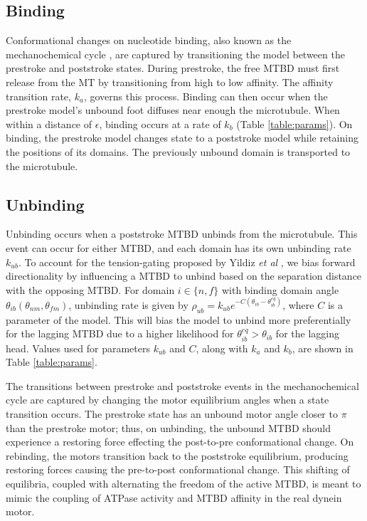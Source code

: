 \documentclass[9pt,twocolumn,twoside]{article}
\begin{document}
\subsection*{Binding}
Conformational changes on nucleotide binding, also known as the mechanochemical cycle \cite{cianfrocco}, are captured by transitioning the model between the prestroke and poststroke states. During prestroke, the free MTBD must first release from the MT by transitioning from high to low affinity. The affinity transition rate, $k_a$, governs this process. Binding can then occur when the prestroke model's unbound foot diffuses near enough the microtubule. When within a distance of $\epsilon$, binding occurs at a rate of $k_b$ (Table \ref{table:params}). On binding, the prestroke model changes state to a poststroke model while retaining the positions of its domains. The previously unbound domain is transported to the microtubule.

\subsection*{Unbinding}
Unbinding occurs when a poststroke MTBD unbinds from the microtubule. This event can occur for either MTBD, and each domain has its own unbinding rate $k_{ub}$. To account for the tension-gating proposed by Yildiz \textit{et al} \cite{yildizcleary}, we bias forward directionality by influencing a MTBD to unbind based on the separation distance with the opposing MTBD. For domain $i \in \{n, f\}$ with binding domain angle $\theta_{ib}\left(\theta_{nm}, \theta_{fm}\right)$, unbinding rate is given by $\rho_{ub} = k_{ub}e^{-C\left(\theta_{ib}-\theta^{eq}_{ib}\right)}$, where $C$ is a parameter of the model. This will bias the model to unbind more preferentially for the lagging MTBD due to a higher likelihood for $\theta^{eq}_{ib} > \theta_{ib}$ for the lagging head. Values used for parameters $k_{ub}$ and $C$, along with $k_a$ and $k_b$, are shown in Table \ref{table:params}.

The transitions between prestroke and poststroke events in the mechanochemical cycle \cite{cianfrocco} are captured by changing the motor equilibrium angles when a state transition occurs. The prestroke state has an unbound motor angle closer to $\pi$ than the prestroke motor\cite{burgess-paper}; thus, on unbinding, the unbound MTBD should experience a restoring force effecting the post-to-pre conformational change. On rebinding, the motors transition back to the poststroke equilibrium, producing restoring forces causing the pre-to-post conformational change. This shifting of equilibria, coupled with alternating the freedom of the active MTBD, is meant to mimic the coupling of ATPase activity and MTBD affinity in the real dynein motor.
\end{document}

